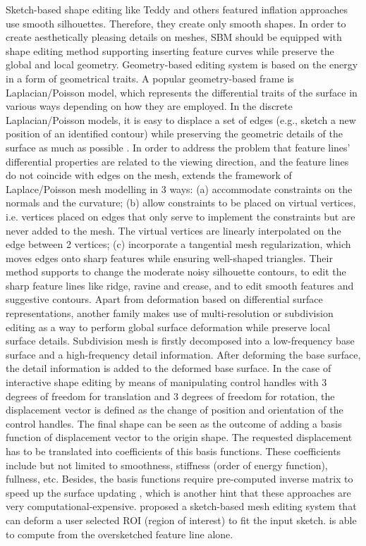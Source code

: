 \documentclass[runningheads]{llncs}
\begin{document}
Sketch-based shape editing like Teddy and others \cite{igarashi2005rigid,nealen2007fibermesh,Karpenko:2006:SFS:1141911.1141928} featured inflation approaches use smooth silhouettes. Therefore, they create only smooth shapes. In order to create aesthetically pleasing details on meshes, SBM should be equipped with shape editing method supporting inserting feature curves while preserve the global and local geometry. Geometry-based editing system is based on the energy in a form of geometrical traits. A popular geometry-based frame is Laplacian/Poisson model, which represents the differential traits of the surface in various ways depending on how they are employed. In the discrete Laplacian/Poisson models, it is easy to displace a set of edges (e.g., sketch a new position of an identified contour) while preserving the geometric details of the surface as much as possible \cite{nealen2007sketch}. In order to address the problem that feature lines’ differential properties are related to the viewing direction, and the feature lines do not coincide with edges on the mesh, \cite{nealen2007fibermesh} extends the framework of Laplace/Poisson mesh modelling in 3 ways: (a) accommodate constraints on the normals and the curvature; (b) allow constraints to be placed on virtual vertices, i.e. vertices placed on edges that only serve to implement the constraints but are never added to the mesh. The virtual vertices are linearly interpolated on the edge between 2 vertices; (c) incorporate a tangential mesh regularization, which moves edges onto sharp features while ensuring well-shaped triangles. Their method supports to change the moderate noisy silhouette contours, to edit the sharp feature lines like ridge, ravine and crease, and to edit smooth features and suggestive contours. Apart from deformation based on differential surface representations, another family makes use of multi-resolution or subdivision editing as a way to perform global surface deformation while preserve local surface details. Subdivision mesh is firstly decomposed into a low-frequency base surface and a high-frequency detail information. After deforming the base surface, the detail information is added to the deformed base surface. In the case of interactive shape editing by means of manipulating control handles with 3 degrees of freedom for translation and 3 degrees of freedom for rotation, the displacement vector is defined as the change of position and orientation of the control handles. The final shape can be seen as the outcome of adding a basis function of displacement vector to the origin shape. The requested displacement has to be translated into coefficients of this basis functions. These coefficients include but not limited to smoothness, stiffness (order of energy function), fullness, etc. Besides, the basis functions require pre-computed inverse matrix to speed up the surface updating \cite{botsch2004intuitive}, which is another hint that these approaches are very computational-expensive.  \cite{nealen2007sketch} proposed a sketch-based mesh editing system that can deform a user selected ROI (region of interest) to fit the input sketch. \cite{Zimmermann:2008:SIS:1411846.1411916} is able to compute from the oversketched feature line alone. 
\end{document}
